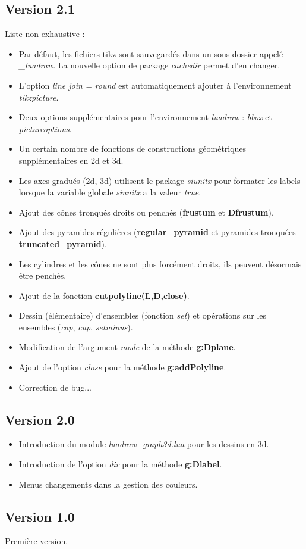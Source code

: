 \subsection{Version 2.1}
Liste non exhaustive :
\begin{itemize}
    \item Par défaut, les fichiers tikz sont sauvegardés dans un sous-dossier appelé \emph{\_luadraw}. La nouvelle option de package \emph{cachedir} permet d'en changer.
    \item L'option \emph{line join = round} est automatiquement ajouter à l'environnement \emph{tikzpicture}.
    \item Deux options supplémentaires pour l'environnement \emph{luadraw} : \emph{bbox} et \emph{pictureoptions}.
    \item Un certain nombre de fonctions de constructions géométriques supplémentaires en 2d et 3d.
    \item Les axes gradués (2d, 3d) utilisent le package \emph{siunitx}  pour formater les labels lorsque la variable globale \emph{siunitx} a la valeur \emph{true}.
    \item Ajout des cônes tronqués droits ou penchés (\textbf{frustum} et \textbf{Dfrustum}).
    \item Ajout des pyramides régulières (\textbf{regular\_pyramid} et pyramides tronquées \textbf{truncated\_pyramid}).
    \item Les cylindres et les cônes ne sont plus forcément droits, ils peuvent désormais être penchés.
    \item Ajout de la fonction \textbf{cutpolyline(L,D,close)}.    
    \item Dessin (élémentaire) d'ensembles (fonction \emph{set}) et opérations sur les ensembles (\emph{cap}, \emph{cup}, \emph{setminus}).
    \item Modification de l'argument \emph{mode} de la méthode \textbf{g:Dplane}.
    \item Ajout de l'option \emph{close} pour la méthode \textbf{g:addPolyline}.
    \item Correction de bug...
\end{itemize}

\subsection{Version 2.0}

\begin{itemize}
    \item Introduction du module \emph{luadraw\_graph3d.lua} pour les dessins en 3d.
    \item Introduction de l'option \emph{dir} pour la méthode \textbf{g:Dlabel}.
    \item Menus changements dans la gestion des couleurs.
\end{itemize}

\subsection{Version 1.0}
Première version.
